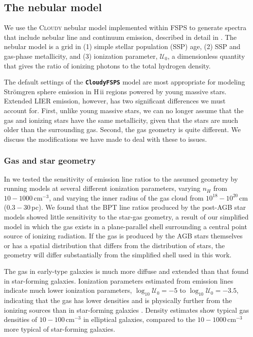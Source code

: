 \documentclass[preprint2]{aastex62}
\newcommand{\FSPS}{{\sc FSPS}\xspace}
\newcommand{\CloudyFSPS}{{\tt \textbf{CloudyFSPS}}\xspace}
\newcommand{\Cloudy}{\textsc{Cloudy}\xspace}
\newcommand{\hii}{H\,{\sc ii}\xspace}
\newcommand{\logten}{\ensuremath{\log_{10}}}
\newcommand{\U}{\ensuremath{\mathcal{U}_{0}}\xspace}
\newcommand{\logUeq}[1]{\ensuremath{\logten \mathcal{U}_0 = #1}}
\begin{document}
\subsection{The nebular model}\label{sec:model:neb}

We use the \Cloudy nebular model implemented within \FSPS to generate spectra that include nebular line and continuum emission, described in detail in \citet{Byler+2017}. The nebular model is a grid in (1) simple stellar population (SSP) age, (2) SSP and gas-phase metallicity, and (3) ionization parameter, \U, a dimensionless quantity that gives the ratio of ionizing photons to the total hydrogen density.

The default settings of the \CloudyFSPS model are most appropriate for modeling Str{\"o}mgren sphere emission in \hii regions powered by young massive stars. Extended LIER emission, however, has two significant differences we must account for. First, unlike young massive stars, we can no longer assume that the gas and ionizing stars have the same metallicity, given that the stars are much older than the surrounding gas. Second, the gas geometry is quite different. We discuss the modifications we have made to deal with these to issues.


\subsubsection{Gas and star geometry}\label{sec:LIERmod:geometry}

In \citet{Byler+2017} we tested the sensitivity of emission line ratios to the assumed geometry by running models at several different ionization parameters, varying $n_{H}$ from $10-1000\,\mathrm{cm}^{-3}$, and varying the inner radius of the gas cloud from $10^{18}-10^{20}\,$cm ($0.3-30\,$pc). We found that the BPT line ratios produced by the post-AGB star models showed little sensitivity to the star-gas geometry, a result of our simplified model in which the gas exists in a plane-parallel shell surrounding a central point source of ionizing radiation. If the gas is produced by the AGB stars themselves or has a spatial distribution that differs from the distribution of stars, the geometry will differ substantially from the simplified shell used in this work. 

The gas in early-type galaxies is much more diffuse and extended than that found in star-forming galaxies. Ionization parameters estimated from emission lines indicate much lower ionization parameters, \logUeq{-5} to \logUeq{-3.5}, indicating that the gas has lower densities and is physically further from the ionizing sources than in star-forming galaxies \citep{Yan+2012}. Density estimates show typical gas densities of $10-100\,\mathrm{cm}^{-3}$ in elliptical galaxies, compared to the $10-1000\,\mathrm{cm}^{-3}$ more typical of star-forming galaxies.
\end{document}
